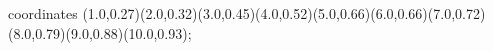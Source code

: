 					coordinates { (1.0,0.27)(2.0,0.32)(3.0,0.45)(4.0,0.52)(5.0,0.66)(6.0,0.66)(7.0,0.72)(8.0,0.79)(9.0,0.88)(10.0,0.93)};
